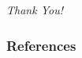 \documentclass[t, aspectratio=169]{beamer}
\begin{document}
\begin{frame}[c]{}
    \centering \Huge
    \emph{Thank You!}
\end{frame}




\begin{frame}[allowframebreaks]
    \frametitle{References}
    \printbibliography
\end{frame}
\end{document}
